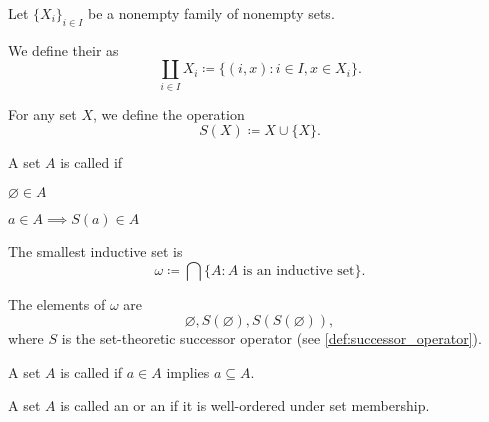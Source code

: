 \begin{definition}\label{def:disjoint_union}
  Let \( \{ X_i \}_{i \in I} \) be a nonempty family of nonempty sets.

  We define their  as
  \begin{equation*}
    \coprod_{i \in I} X_i \coloneqq \{ (i, x) \colon i \in I, x \in X_i \}.
  \end{equation*}
\end{definition}

\begin{definition}\label{def:successor_operator}\cite[68]{Enderton1977}
  For any set \( X \), we define the  operation
  \begin{equation*}
    S(X) \coloneqq X \cup \{ X \}.
  \end{equation*}
\end{definition}

\begin{definition}\label{def:inductive_set}\cite[68]{Enderton1977}
  A set \( A \) is called  if
  \begin{defenum}
    \item \( \varnothing \in A \)
    \item \( a \in A \implies S(a) \in A \)
  \end{defenum}
\end{definition}

\begin{definition}\label{def:smallest_inductive_set}
  The smallest inductive set is
  \begin{equation*}
    \omega \coloneqq \bigcap \{ A \colon A \text{ is an inductive set} \}.
  \end{equation*}

  The elements of \( \omega \) are
  \begin{equation*}
    \varnothing, S(\varnothing), S(S(\varnothing)),
  \end{equation*}
  where \( S \) is the set-theoretic successor operator (see \cref{def:successor_operator}).
\end{definition}

\begin{definition}\label{def:transitive_set}\cite[71]{Enderton1977}
  A set \( A \) is called  if \( a \in A \) implies \( a \subseteq A \).
\end{definition}

\begin{definition}\label{def:ordinal}\cite[theorem 7L]{Enderton1977}
  A set \( A \) is called an  or an  if it is well-ordered under set membership.
\end{definition}

